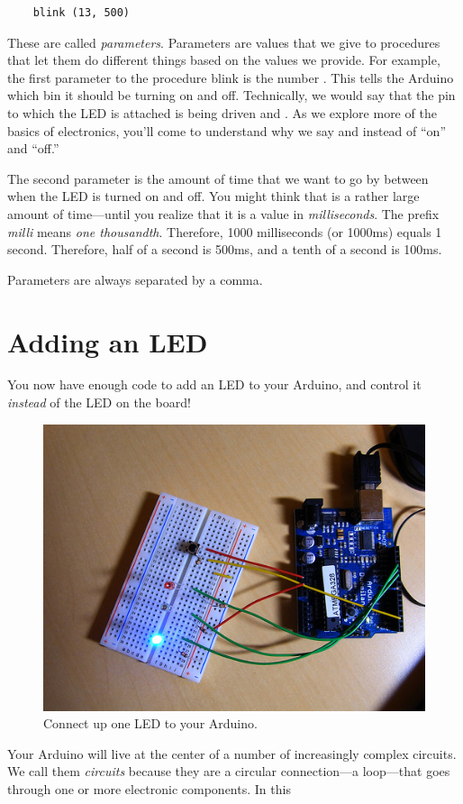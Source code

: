 \begin{verbatim}
	blink (13, 500)
\end{verbatim}

These are called {\em parameters}. Parameters are values that we give to procedures that let them do different things based on the values we provide. For example, the first parameter to the procedure {\code blink} is the number {}. This tells the Arduino which bin it should be turning on and off. Technically, we would say that the pin to which the LED is attached is being driven \HIGH and \LOW. As we explore more of the basics of electronics, you'll come to understand why we say \HIGH and \LOW instead of ``on'' and ``off.''

The second parameter is the amount of time that we want to go by between when the LED is turned on and off. You might think that {} is a rather large amount of time---until you realize that it is a value in {\em milliseconds}. The prefix {\em milli} means {\em one thousandth}. Therefore, 1000 milliseconds (or 1000ms) equals 1 second. Therefore, half of a second is 500ms, and a tenth of a second is 100ms. 

Parameters are always separated by a comma.

\section{Adding an LED}
You now have enough \plumbing code to add an LED to your Arduino, and control it {\em instead} of the LED on the board!

\begin{figure}[h]
  \begin{center}
    \includegraphics[width=\linewidth]{images/one-led}
    \caption{Connect up one LED to your Arduino.}
    \label{circuit:one-led}
  \end{center}
\end{figure}

Your Arduino will live at the center of a number of increasingly complex circuits. We call them {\em circuits} because they are a circular connection---a loop---that goes through one or more electronic components. In this 